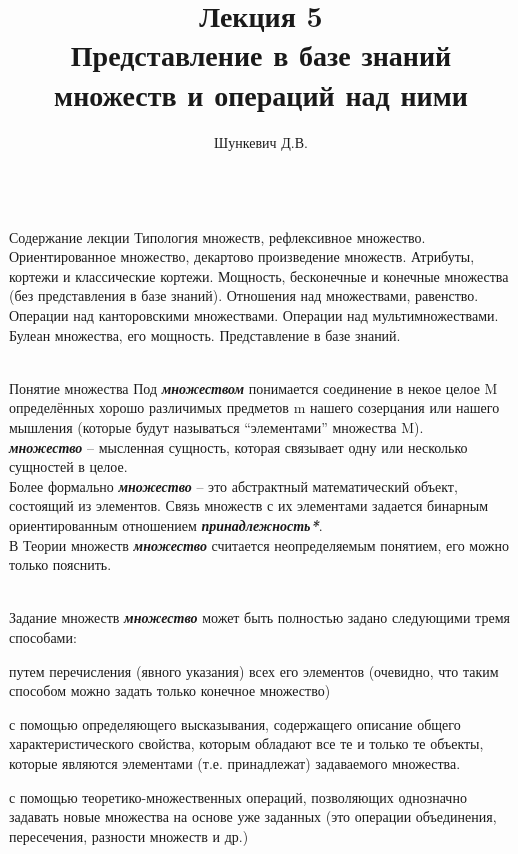 \title{Лекция 5\\Представление в базе знаний множеств и операций над ними}   
\author[]{Шункевич Д.В.}

\begin{frame}
	\titlepage
\end{frame}

\begin{frame}{\\Содержание лекции}
	\topline
	\justifying
	Типология множеств, рефлексивное множество. Ориентированное множество, декартово произведение множеств. Атрибуты, кортежи и классические кортежи. Мощность, бесконечные и конечные множества (без представления в базе знаний). Отношения над множествами, равенство. Операции над канторовскими множествами. Операции над мультимножествами. Булеан множества, его мощность. Представление в базе знаний.
\end{frame}

\begin{frame}{\\Понятие множества}
	\topline
	\justifying
	Под \textbf{\textit{множеством}} понимается соединение в некое целое M определённых хорошо различимых предметов m нашего созерцания или нашего мышления (которые будут называться ``элементами'' множества M).\\
	\bigskip
	\textbf{\textit{множество}} -- мысленная сущность, которая связывает одну или несколько сущностей в целое.\\
	\bigskip
	Более формально \textbf{\textit{множество}} -- это абстрактный математический объект, состоящий из элементов. Связь множеств с их элементами задается бинарным ориентированным отношением \textbf{\textit{принадлежность*}}.\\
	\bigskip
	В Теории множеств \textbf{\textit{множество}} считается неопределяемым понятием, его можно только пояснить.
	\vspace{-3em}
\end{frame}

\begin{frame}{\\Задание множеств} %
	\topline
	\justifying
	\textbf{\textit{множество}} может быть полностью задано следующими тремя способами:
	\begin{textitemize}
		\item путем перечисления (явного указания) всех его элементов (очевидно, что таким способом можно задать только конечное множество)
		\item с помощью определяющего высказывания, содержащего описание общего характеристического свойства, которым обладают все те и только те объекты, которые являются элементами (т.е. принадлежат) задаваемого множества.
		\item с помощью теоретико-множественных операций, позволяющих однозначно задавать новые множества на основе уже заданных (это операции объединения, пересечения, разности множеств и др.)
	\end{textitemize}
	\vspace{-1.5em}
\end{frame}

